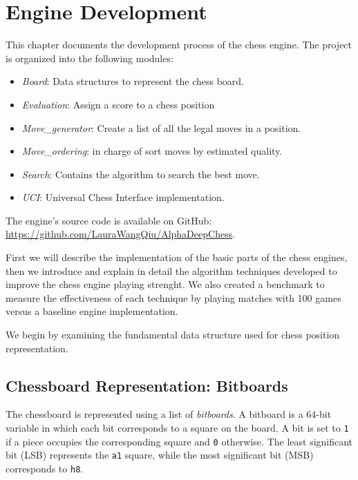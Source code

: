 \chapter{Engine Development}
\label{cap:descripcionTrabajo}

\noindent This chapter documents the development process of the chess engine. The project is organized into the following
 modules:

\begin{itemize}
    \item \textit{Board}: Data structures to represent the chess board.
    \item \textit{Evaluation}: Assign a score to a chess position
    \item \textit{Move\_generator}: Create a list of all the legal moves in a position.
    \item \textit{Move\_ordering}: in charge of sort moves by estimated quality.
    \item \textit{Search}: Contains the algorithm to search the best move.
    \item \textit{UCI}: Universal Chess Interface implementation.
\end{itemize}
\vspace{1em}

\noindent The engine's source code is available on GitHub:\\
\scriptsize\url{https://github.com/LauraWangQiu/AlphaDeepChess}\normalsize. 

\vspace{2em}

\noindent First we will describe the implementation of the basic parts of the chess engines, then we introduce and explain in detail the algorithm techniques developed to improve the chess engine playing strenght. We also created a benchmark to measure the effectiveness of each technique by playing matches with 100 games versus a baseline engine implementation.

\vspace{2em}

\noindent We begin by examining the fundamental data structure used for chess position representation.

\newpage

\section{Chessboard Representation: Bitboards}

\noindent The chessboard is represented using a list of \textit{bitboards}. A bitboard is a 64-bit variable in which each bit corresponds to a square on the board. A bit is set to \texttt{1} if a piece occupies the corresponding square and \texttt{0} otherwise. The least significant bit (LSB) represents the \texttt{a1} square, while the most significant bit (MSB) corresponds to \texttt{h8}. ~\cite{Bitboards}
 
